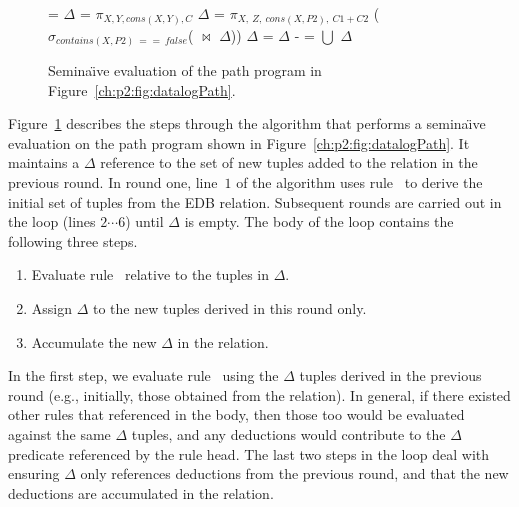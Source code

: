 \begin{figure}
\ssp
\begin{boxedminipage}{\linewidth}
    \begin{algorithmic}[1]
      \STATE {} = $\Delta$ = $\pi_{X, Y, cons(X, Y), C}$
      	\STATE $\Delta$ = $\pi_{X,\ Z,\ cons(X, P2),\ C1+C2}$ 
      	($\sigma_{contains(X,P2)\ ==\ false}$( $\Join$ $\Delta$)) 
      	\STATE $\Delta$ = $\Delta$ - 
      	\STATE {} =  $\bigcup$ $\Delta$
      \ENDWHILE
    \end{algorithmic}
\end{boxedminipage}
\caption{\label{ch:p2:fig:seminaive}Semina\"{\i}ve evaluation of the 
path program in Figure~\ref{ch:p2:fig:datalogPath}.}
\end{figure}

Figure~\ref{ch:p2:fig:seminaive} describes the steps through the algorithm that
performs a semina\"{\i}ve evaluation on the path program shown in
Figure~\ref{ch:p2:fig:datalogPath}.  It maintains a $\Delta$ reference
to the set of new tuples added to the  relation in the previous round.
In round one, line~$1$ of the algorithm uses rule~ to derive the initial
set of  tuples from the EDB  relation.  Subsequent rounds are
carried out in the  loop (lines $2 \cdots 6$) until $\Delta$
is empty.  The body of the loop contains the following three steps.
\begin{enumerate} \ssp 
  \item Evaluate rule~ relative to the tuples in
    $\Delta$.  
  \item Assign $\Delta$ to the new tuples
    derived in this round only.  
  \item Accumulate the new $\Delta$ in the  relation.  
\end{enumerate}

In the first step, we evaluate rule~ using the $\Delta$ tuples
derived in the previous round (e.g., initially, those obtained from the
 relation).  In general, if there existed other rules that referenced
 in the body, then those too would be evaluated against the same
$\Delta$ tuples, and any deductions would contribute to the $\Delta$
predicate referenced by the rule head.  The last two steps in the loop deal
with ensuring $\Delta$ only references deductions from the previous
round, and that the new deductions are accumulated in the  relation.


